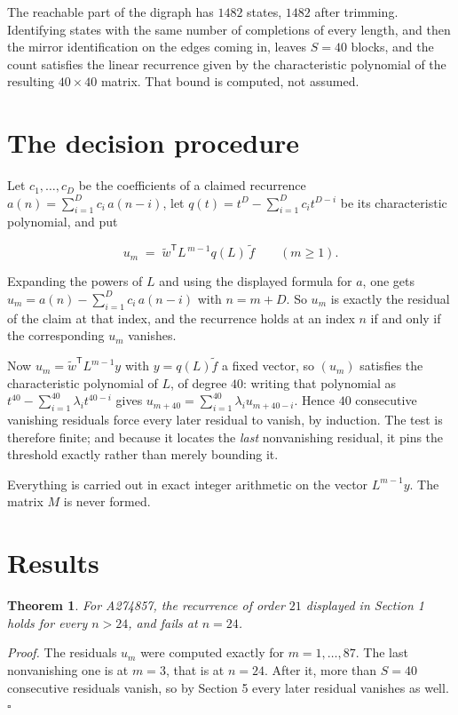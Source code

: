 \documentclass[11pt]{article}
\newtheorem{theorem}{Theorem}
\theoremstyle{definition}
\begin{document}
The reachable part of the digraph has $1482$ states, $1482$ after trimming. Identifying states with the same number of completions of every length, and then the mirror identification on the edges coming in, leaves $S = 40$ blocks, and the count satisfies the linear recurrence given by the characteristic polynomial of the resulting $40\times40$ matrix. That bound is computed, not assumed.

\section{The decision procedure}

Let $c_1,\dots,c_D$ be the coefficients of a claimed recurrence $a(n) = \sum_{i=1}^{D} c_i\,a(n-i)$, let $q(t) = t^{D} - \sum_{i=1}^{D} c_i t^{D-i}$ be its characteristic polynomial, and put

\[u_m \;=\; \tilde w^{\mathsf T} L^{\,m-1} q(L)\,\tilde f \qquad (m \ge 1).\]

Expanding the powers of $L$ and using the displayed formula for $a$, one gets $u_m = a(n) - \sum_{i=1}^{D} c_i\,a(n-i)$ with $n = m + D$. So $u_m$ is exactly the residual of the claim at that index, and the recurrence holds at an index $n$ if and only if the corresponding $u_m$ vanishes.

Now $u_m = \tilde w^{\mathsf T} L^{m-1} y$ with $y = q(L)\tilde f$ a fixed vector, so $(u_m)$ satisfies the characteristic polynomial of $L$, of degree $40$: writing that polynomial as $t^{40} - \sum_{i=1}^{40} \lambda_i t^{40-i}$ gives $u_{m+40} = \sum_{i=1}^{40} \lambda_i u_{m+40-i}$. Hence $40$ consecutive vanishing residuals force every later residual to vanish, by induction. The test is therefore finite; and because it locates the {\itshape last} nonvanishing residual, it pins the threshold exactly rather than merely bounding it.

Everything is carried out in exact integer arithmetic on the vector $L^{m-1}y$. The matrix $M$ is never formed.

\section{Results}

\begin{theorem} For A274857, the recurrence of order $21$ displayed in Section 1 holds for every $n > 24$, and fails at $n = 24$.\end{theorem}

{\itshape Proof.} The residuals $u_m$ were computed exactly for $m = 1,\dots,87$. The last nonvanishing one is at $m = 3$, that is at $n = 24$. After it, more than $S = 40$ consecutive residuals vanish, so by Section 5 every later residual vanishes as well. $\square$
\end{document}
